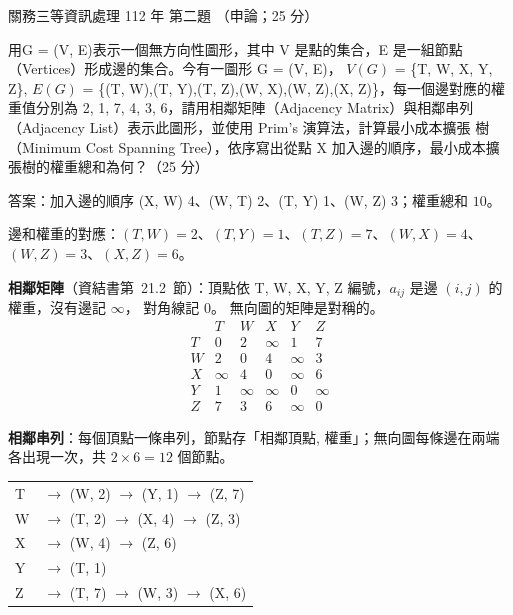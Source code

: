 \begin{pastexam}[label={px:gw3-112-ds-02}]{關務三等資訊處理 112 年 第二題}
（申論；25 分）

用G = (V, E)表示一個無方向性圖形，其中 V 是點的集合，E 是一組節點（Vertices）形成邊的集合。今有一圖形 G = (V, E)，
$V(G)$ = \{T, W, X, Y, Z\}, $E(G)$ = \{(T, W),(T, Y),(T, Z),(W, X),(W, Z),(X, Z)\}，每一個邊對應的權重值分別為 2, 1, 7, 4,
3, 6，請用相鄰矩陣（Adjacency Matrix）與相鄰串列（Adjacency List）表示此圖形，並使用 Prim's 演算法，計算最小成本擴張
樹（Minimum Cost Spanning Tree），依序寫出從點 X 加入邊的順序，最小成本擴張樹的權重總和為何？（25 分）
\end{pastexam}

\begin{pastsoln}
答案：加入邊的順序 (X, W) 4、(W, T) 2、(T, Y) 1、(W, Z) 3；權重總和 $10$。

邊和權重的對應：$(T,W) = 2$、$(T,Y) = 1$、$(T,Z) = 7$、$(W,X) = 4$、$(W,Z) = 3$、$(X,Z) = 6$。
\begin{center}
\end{center}

\textbf{相鄰矩陣}（資結書第~21.2~節）：頂點依 T, W, X, Y, Z 編號，$a_{ij}$ 是邊 $(i, j)$ 的權重，沒有邊記 $\infty$，
對角線記 $0$。 無向圖的矩陣是對稱的。
\[
\begin{array}{c|ccccc}
 & T & W & X & Y & Z \\ \hline
T & 0 & 2 & \infty & 1 & 7 \\
W & 2 & 0 & 4 & \infty & 3 \\
X & \infty & 4 & 0 & \infty & 6 \\
Y & 1 & \infty & \infty & 0 & \infty \\
Z & 7 & 3 & 6 & \infty & 0
\end{array}
\]

\textbf{相鄰串列}：每個頂點一條串列，節點存「相鄰頂點, 權重」；無向圖每條邊在兩端各出現一次，共 $2 \times 6 = 12$ 個節點。
\begin{center}
\small
\begin{tabular}{ll}
T & $\to$ (W, 2) $\to$ (Y, 1) $\to$ (Z, 7) \\
W & $\to$ (T, 2) $\to$ (X, 4) $\to$ (Z, 3) \\
X & $\to$ (W, 4) $\to$ (Z, 6) \\
Y & $\to$ (T, 1) \\
Z & $\to$ (T, 7) $\to$ (W, 3) $\to$ (X, 6) \\
\end{tabular}
\end{center}


\end{pastsoln}
